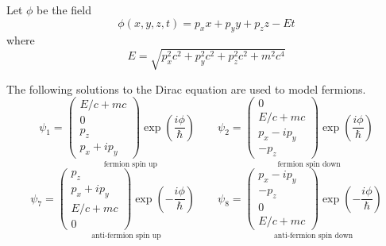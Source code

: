 \documentclass[12pt]{article}
\begin{document}
\noindent
Let $\phi$ be the field
\begin{equation*}
\phi(x,y,z,t)=p_xx+p_yy+p_zz-Et
\end{equation*}
where
\begin{equation*}
E=\sqrt{p_x^2c^2+p_y^2c^2+p_z^2c^2+m^2c^4}
\end{equation*}

\noindent
The following solutions to the Dirac equation are used to model fermions.
\begin{equation*}
\psi_1=\underset{\text{fermion spin up}}
{
\begin{pmatrix}E/c+mc\\0\\p_z\\p_x+ip_y\end{pmatrix}
\exp\left(\frac{i\phi}{\hbar}\right)
}
\qquad
\psi_2=\underset{\text{fermion spin down}}
{
\begin{pmatrix}0\\E/c+mc\\p_x-ip_y\\-p_z\end{pmatrix}
\exp\left(\frac{i\phi}{\hbar}\right)
}
\end{equation*}
\begin{equation*}
\psi_7=\underset{\text{anti-fermion spin up}}
{
\begin{pmatrix}p_z\\p_x+ip_y\\E/c+mc\\0\end{pmatrix}
\exp\left(-\frac{i\phi}{\hbar}\right)
}
\qquad
\psi_8=\underset{\text{anti-fermion spin down}}
{
\begin{pmatrix}p_x-ip_y\\-p_z\\0\\E/c+mc\end{pmatrix}
\exp\left(-\frac{i\phi}{\hbar}\right)
}
\end{equation*}
\end{document}
